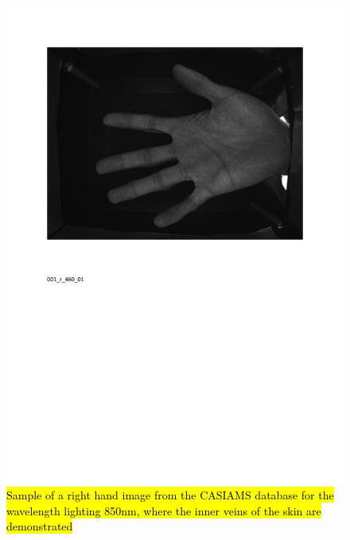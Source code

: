 \documentclass[review]{elsarticle}
\begin{document}
		\begin{figure}[!h]
		    \centering
		    \includegraphics[page=4,scale=.57,trim=1cm 14.7cm 1cm 1.7cm,clip]{CASIA_multi_spectral_samples.pdf}
		    \caption{\hl{Sample of a right hand image from the CASIAMS database for the wavelength lighting 850nm, where the inner veins of the skin are demonstrated}}
		    \label{fig:IIT_problematic_rings4}
		\end{figure}
\end{document}

